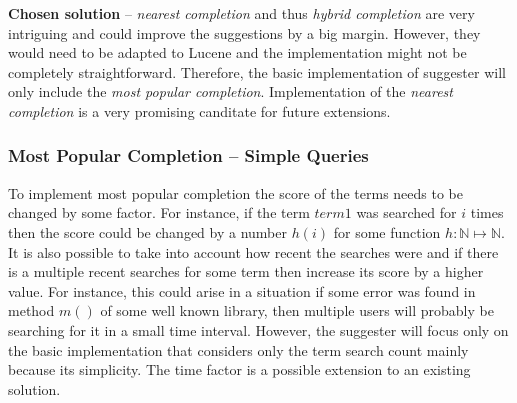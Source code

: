 \textbf{Chosen solution} – \textit{nearest completion} and thus \textit{hybrid completion} are very intriguing and could
improve the suggestions by a big margin. However, they would need to be adapted to Lucene and the implementation
might not be completely straightforward. Therefore, the basic implementation of suggester will only include the
\textit{most popular completion}. Implementation of the \textit{nearest completion} is a very promising canditate for
future extensions.

\subsubsection{Most Popular Completion – Simple Queries}

To implement most popular completion the score of the terms needs to be changed by some factor. For instance, if the term
$term1$ was searched for $i$ times then the score could be changed by a number $h(i)$ for some function $h: \mathbb{N} \mapsto \mathbb{N}$.
It is also possible to take into account how recent the searches were and if there is a multiple recent searches for some
term then increase its score by a higher value. For instance, this could arise in a situation if some error was found in
method $m()$ of some well known library, then multiple users will probably be searching for it in a small time interval.
However, the suggester will focus only on the basic implementation that considers only the term search count mainly because
its simplicity. The time factor is a possible extension to an existing solution.


